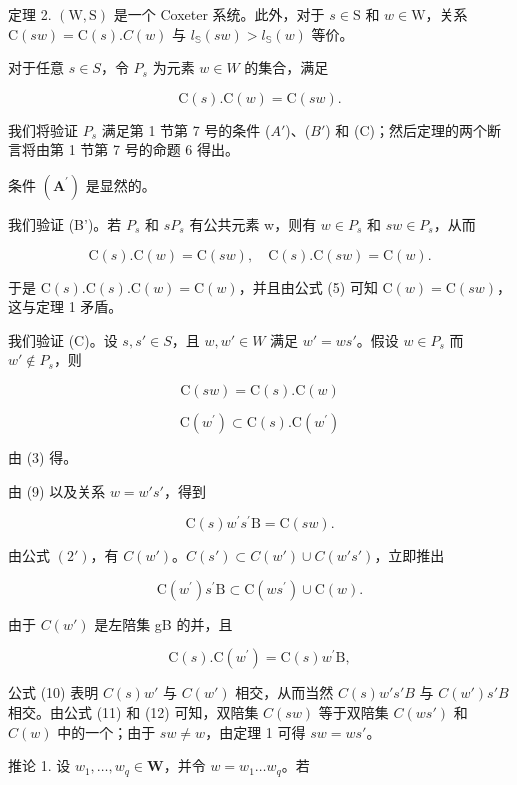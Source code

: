 定理 2. \((\mathrm{W},\mathrm{S})\) 是一个 Coxeter 系统。此外，对于 \(s\in \mathrm{S}\) 和 \(w\in \mathrm{W}\)，关系 \(\mathrm{C}(sw) = \mathrm{C}(s).C(w)\) 与 \(l_{\mathbb{S}}(sw) > l_{\mathbb{S}}(w)\) 等价。

对于任意 \(s \in S\)，令 \(P_s\) 为元素 \(w \in W\) 的集合，满足

\[
\mathrm{C} (s). \mathrm{C} (w) = \mathrm{C} (s w).
\]

我们将验证 \(P_{s}\) 满足第 1 节第 7 号的条件 (\(A'\))、(\(B'\)) 和 (C)；然后定理的两个断言将由第 1 节第 7 号的命题 6 得出。

条件 \((\mathbf{A}^{\prime})\) 是显然的。

我们验证 (B')。若 \(P_{s}\) 和 \(sP_{s}\) 有公共元素 w，则有 \(w \in P_{s}\) 和 \(sw \in P_{s}\)，从而

\[
\mathrm{C} (s). \mathrm{C} (w) = \mathrm{C} (s w), \quad \mathrm{C} (s). \mathrm{C} (s w) = \mathrm{C} (w).
\]

于是 \(\mathrm{C}(s).\mathrm{C}(s).\mathrm{C}(w) = \mathrm{C}(w)\)，并且由公式 (5) 可知 \(\mathrm{C}(w) = \mathrm{C}(sw)\)，这与定理 1 矛盾。

我们验证 (C)。设 \(s, s' \in S\)，且 \(w, w' \in W\) 满足 \(w' = ws'\)。假设 \(w \in P_s\) 而 \(w' \notin P_s\)，则

\[
\mathrm{C} (s w) = \mathrm{C} (s). \mathrm{C} (w)\tag{9}
\]

\[
\mathrm{C} (w ^ {\prime}) \subset \mathrm{C} (s). \mathrm{C} (w ^ {\prime})\tag{10}
\]

由 (3) 得。

由 (9) 以及关系 \(w = w's'\)，得到

\[
\mathrm{C} (s) w ^ {\prime} s ^ {\prime} \mathrm{B} = \mathrm{C} (s w).\tag{11}
\]

由公式 \((2')\)，有 \(C(w')\)。\(C(s') \subset C(w') \cup C(w's')\)，立即推出

\[
\mathrm{C} (w ^ {\prime}) s ^ {\prime} \mathrm{B} \subset \mathrm{C} (w s ^ {\prime}) \cup \mathrm{C} (w).\tag{12}
\]

由于 \(C(w')\) 是左陪集 gB 的并，且

\[
\mathrm{C} (s). \mathrm{C} (w ^ {\prime}) = \mathrm{C} (s) w ^ {\prime} \mathrm{B},
\]

公式 (10) 表明 \(C(s)w'\) 与 \(C(w')\) 相交，从而当然 \(C(s)w's'B\) 与 \(C(w')s'B\) 相交。由公式 (11) 和 (12) 可知，双陪集 \(C(sw)\) 等于双陪集 \(C(ws')\) 和 \(C(w)\) 中的一个；由于 \(sw \neq w\)，由定理 1 可得 \(sw = ws'\)。

推论 1. 设 \(w_{1}, \ldots, w_{q} \in \mathbf{W}\)，并令 \(w = w_{1} \ldots w_{q}\)。若

